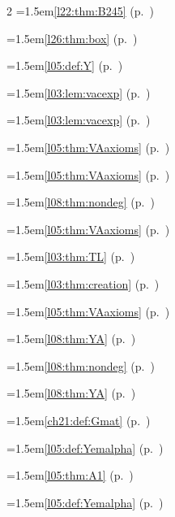 \begin{multicols}{2}
\hangindent=1.5em\quad \ref{l22:thm:B245} (p.~\pageref{l22:thm:B245})\par
\hangindent=1.5em\quad \ref{l26:thm:box} (p.~\pageref{l26:thm:box})\par
\par{}\par\nopagebreak\smallskip
\hangindent=1.5em\quad \ref{l05:def:Y} (p.~\pageref{l05:def:Y})\par
\hangindent=1.5em\quad \ref{l03:lem:vacexp} (p.~\pageref{l03:lem:vacexp})\par
\hangindent=1.5em\quad \ref{l03:lem:vacexp} (p.~\pageref{l03:lem:vacexp})\par
\hangindent=1.5em\quad \ref{l05:thm:VAaxioms} (p.~\pageref{l05:thm:VAaxioms})\par
\hangindent=1.5em\quad \ref{l05:thm:VAaxioms} (p.~\pageref{l05:thm:VAaxioms})\par
\hangindent=1.5em\quad \ref{l08:thm:nondeg} (p.~\pageref{l08:thm:nondeg})\par
\hangindent=1.5em\quad \ref{l05:thm:VAaxioms} (p.~\pageref{l05:thm:VAaxioms})\par
\hangindent=1.5em\quad \ref{l03:thm:TL} (p.~\pageref{l03:thm:TL})\par
\hangindent=1.5em\quad \ref{l03:thm:creation} (p.~\pageref{l03:thm:creation})\par
\hangindent=1.5em\quad \ref{l05:thm:VAaxioms} (p.~\pageref{l05:thm:VAaxioms})\par
\hangindent=1.5em\quad \ref{l08:thm:YA} (p.~\pageref{l08:thm:YA})\par
\hangindent=1.5em\quad \ref{l08:thm:nondeg} (p.~\pageref{l08:thm:nondeg})\par
\hangindent=1.5em\quad \ref{l08:thm:YA} (p.~\pageref{l08:thm:YA})\par
\hangindent=1.5em\quad \ref{ch21:def:Gmat} (p.~\pageref{ch21:def:Gmat})\par
\hangindent=1.5em\quad \ref{l05:def:Yemalpha} (p.~\pageref{l05:def:Yemalpha})\par
\hangindent=1.5em\quad \ref{l05:thm:A1} (p.~\pageref{l05:thm:A1})\par
\hangindent=1.5em\quad \ref{l05:def:Yemalpha} (p.~\pageref{l05:def:Yemalpha})\par

\end{multicols}
